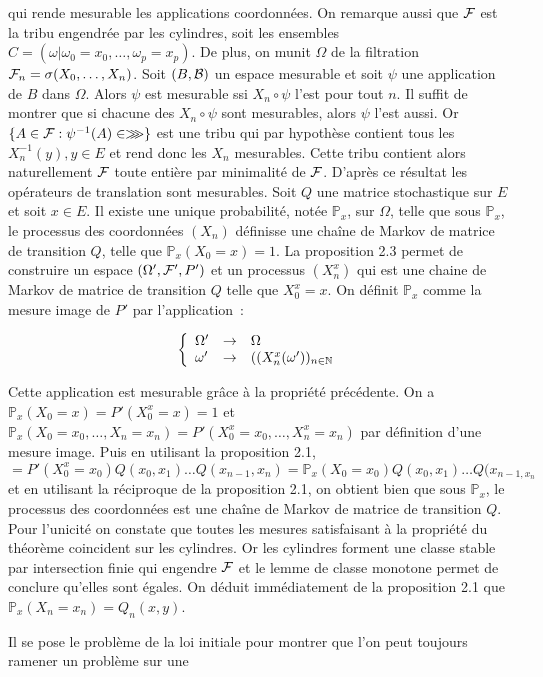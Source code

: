 qui rende mesurable les applications coordonnées. On remarque aussi que $\mathcal{F}$ est la tribu engendrée par 
les cylindres, soit les ensembles $C = (\omega|\omega_0=x_0,\ldots,\omega_p=x_p)$.
De plus, on munit $\Omega$ de la filtration $\mathcal{F}_n=\sigma(X_0,\ldots,X_n)$.
\proposition Soit $(B,\mathcal{B})$ un espace mesurable et soit $\psi$ une application de $B$ dans $\Omega$. Alors $\psi$
est mesurable ssi $X_n\circ\psi$ l'est pour tout $n$.
\dem Il suffit de montrer que si chacune des $X_n\circ\psi$ sont mesurables, alors $\psi$ l'est aussi. Or
$\{A\in\mathcal{F} : \psi^{-1}(A)\in\ggg\}$ est une tribu qui par hypothèse contient tous les $X_n^{-1}(y),y\in E$
et rend donc les $X_n$ mesurables. Cette tribu contient alors naturellement $\mathcal{F}$ toute entière par 
minimalité de $\mathcal{F}$.
\rmq D'après ce résultat les opérateurs de translation sont mesurables.
Soit $Q$ une matrice stochastique sur $E$ et soit $x\in E$. Il existe une unique probabilité, notée
$\mathbb{P}_x$, sur $\Omega$, telle que sous $\mathbb{P}_x$, le processus des coordonnées $(X_n)$ définisse
une chaîne de Markov de matrice de transition $Q$, telle que $\mathbb{P}_x(X_0=x) = 1$.
\dem La proposition 2.3 permet de construire un espace $(\Omega',\mathcal{F}',P')$ et un processus $(X_n^x)$ qui
est une chaine de Markov de matrice de transition $Q$ telle que $X_0^x=x$. On définit $\mathbb{P}_x$
comme la mesure image de $P'$ par l'application~:\par
$$\left\lbrace\begin{array}{lcl}\Omega' & \rightarrow & \Omega\\ \omega' & \rightarrow & ((X_n^x(\omega'))_{n\in\mathbb{N}}\end{array}\right.$$\par
Cette application est mesurable grâce à la propriété précédente. On a $\mathbb{P}_x(X_0=x)=P'(X_0^x=x)=1$ et
$\mathbb{P}_x(X_0=x_0,\ldots,X_n=x_n) = P'(X_0^x=x_0,\ldots,X_n^x=x_n)$ par définition d'une mesure image.
Puis en utilisant la proposition 2.1, $= P'(X_0^x=x_0)Q(x_0,x_1)\ldots Q(x_{n-1},x_n) = \mathbb{P}_x(X_0=x_0)
Q(x_0,x_1)\ldots Q(x_{n-1,x_n}$ et en utilisant la réciproque de la proposition 2.1, on obtient bien que
sous $\mathbb{P}_x$, le processus des coordonnées est une chaîne de Markov de matrice de transition $Q$. Pour
l'unicité on constate que toutes les mesures satisfaisant à la propriété du théorème coincident sur les 
cylindres. Or les cylindres forment une classe stable par intersection finie qui engendre $\mathcal{F}$ et le lemme
de classe monotone permet de conclure qu'elles sont égales.
\rmq On déduit immédiatement de la proposition 2.1 que $\mathbb{P}_x(X_n=x_n)=Q_n(x,y)$.\par
Il se pose le problème de la loi initiale pour montrer que l'on peut toujours ramener un problème sur une 
